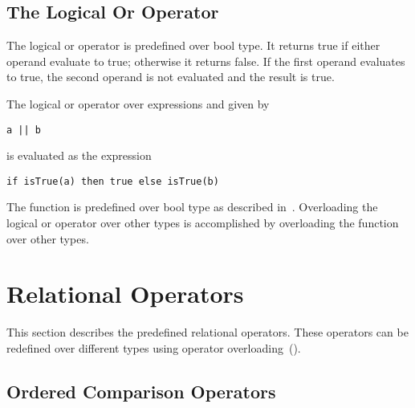 \subsection{The Logical Or Operator}
\label{Logical_Or_Operators}


The logical or operator is predefined over bool type.  It returns
true if either operand evaluate to true; otherwise it returns false.
If the first operand evaluates to true, the second operand is not
evaluated and the result is true.

The logical or operator over expressions  and  given
by
\begin{chapel}
\begin{verbatim}
a || b
\end{verbatim}
\end{chapel}
is evaluated as the expression
\begin{chapel}
\begin{verbatim}
if isTrue(a) then true else isTrue(b)
\end{verbatim}
\end{chapel}

The function  is predefined over bool type as described
in~.  Overloading the logical or operator
over other types is accomplished by overloading the 
function over other types.

\pagebreak
\section{Relational Operators}
\label{Relational_Operators}

This section describes the predefined relational operators.  These
operators can be redefined over different types using operator
overloading~().

\subsection{Ordered Comparison Operators}
\label{Ordered_Comparison_Operators}

